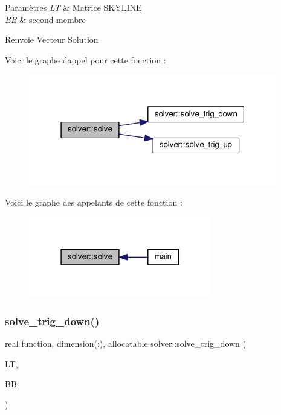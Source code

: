 \begin{DoxyParams}{Paramètres}
{\em LT} & Matrice S\+K\+Y\+L\+I\+NE \\
\hline
{\em BB} & second membre \\
\hline
\end{DoxyParams}
\begin{DoxyReturn}{Renvoie}
Vecteur Solution 
\end{DoxyReturn}
Voici le graphe d\textquotesingle{}appel pour cette fonction \+:
\nopagebreak
\begin{figure}[H]
\begin{center}
\leavevmode
\includegraphics[width=307pt]{namespacesolver_af3691d2059a024a82bab7751a99e6006_cgraph}
\end{center}
\end{figure}
Voici le graphe des appelants de cette fonction \+:
\nopagebreak
\begin{figure}[H]
\begin{center}
\leavevmode
\includegraphics[width=226pt]{namespacesolver_af3691d2059a024a82bab7751a99e6006_icgraph}
\end{center}
\end{figure}
\mbox{\label{namespacesolver_ad8b8ef6c982475b3fb276f93660b750f}} 
\subsubsection{\texorpdfstring{solve\+\_\+trig\+\_\+down()}{solve\_trig\_down()}}
{\footnotesize\ttfamily real function, dimension(\+:), allocatable solver\+::solve\+\_\+trig\+\_\+down (\begin{DoxyParamCaption}\item[{type(skyline\+\_\+matrix)}]{LT,  }\item[{real, dimension(\+:), allocatable}]{BB }\end{DoxyParamCaption})}



